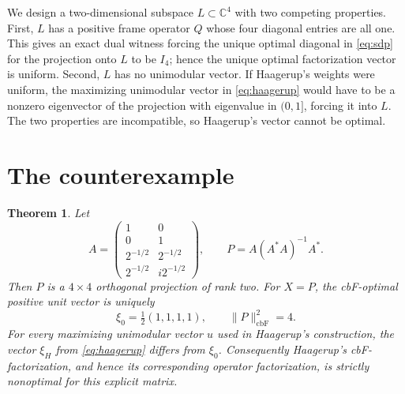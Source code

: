 \documentclass[11pt]{article}
\newtheorem{theorem}{Theorem}
\newcommand{\C}{\mathbb C}
\newcommand{\cbF}{\mathrm{cbF}}
\begin{document}
We design a two-dimensional subspace $L\subset\C^4$ with two competing
properties.  First, $L$ has a positive frame operator $Q$ whose four diagonal
entries are all one.  This gives an exact dual witness forcing the unique
optimal diagonal in \eqref{eq:sdp} for the projection onto $L$ to be $I_4$;
hence the unique optimal factorization vector is uniform.  Second, $L$ has no
unimodular vector.  If Haagerup's weights were uniform, the maximizing
unimodular vector in \eqref{eq:haagerup} would have to be a nonzero eigenvector
of the projection with eigenvalue in $(0,1]$, forcing it into $L$.  The two
properties are incompatible, so Haagerup's vector cannot be optimal.

\section{The counterexample}

\begin{theorem}
Let
\begin{equation}
 A=\begin{pmatrix}
 1&0\\
 0&1\\
 2^{-1/2}&2^{-1/2}\\
 2^{-1/2}&i2^{-1/2}
 \end{pmatrix},
 \qquad
 P=A(A^*A)^{-1}A^*.
 \label{eq:A-P}
\end{equation}
Then $P$ is a $4\times4$ orthogonal projection of rank two.  For $X=P$,
the cbF-optimal positive unit vector is uniquely
\[
 \xi_0=\tfrac12(1,1,1,1),
 \qquad \|P\|_{\cbF}^2=4.
\]
For every maximizing unimodular vector $u$ used in Haagerup's construction,
the vector $\xi_H$ from \eqref{eq:haagerup} differs from $\xi_0$.
Consequently Haagerup's cbF-factorization, and hence its corresponding
operator factorization, is strictly nonoptimal for this explicit matrix.
\end{theorem}
\end{document}
